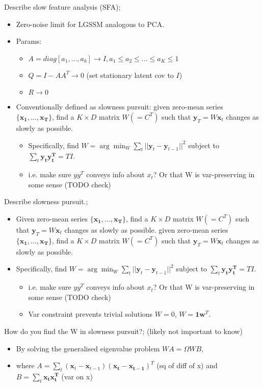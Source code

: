 \documentclass{article}
\begin{document}
Describe slow feature analysis (SFA); \begin{itemize} \item Zero-noise limit for LGSSM analogous to PCA. \item Params: \begin{itemize} \item $A=diag[a_1,...,a_k]\rightarrow I, a_1\leq a_2 \leq ...\leq a_K\leq 1$ \item $Q=I-AA^T\rightarrow 0$ (set stationary latent cov to $I$) \item $R\rightarrow 0$ \end{itemize} \item Conventionally defined as slowness pursuit: given zero-mean series $\{\mathbf{x_1,...,x_T}\}$, find a $K\times D$ matrix $W(=C^T)$ such that $\mathbf{y}_T=W\mathbf{x}_t$ changes as slowly as possible. \begin{itemize} \item Specifically, find $W=\arg\min_W\sum_t||\mathbf{y}_t-\mathbf{y}_{t-1}||^2$ subject to $\sum_t\mathbf{y_ty_t^T}=TI$. \item i.e. make sure $yy^T$ conveys info about $x_t$? Or that W is var-preserving in some sense (TODO check) \end{itemize} \end{itemize}

Describe slowness pursuit.; \begin{itemize} \item Given zero-mean series $\{\mathbf{x_1,...,x_T}\}$, find a $K\times D$ matrix $W(=C^T)$ such that $\mathbf{y}_T=W\mathbf{x}_t$ changes as slowly as possible. given zero-mean series $\{\mathbf{x_1,...,x_T}\}$, find a $K\times D$ matrix $W(=C^T)$ such that $\mathbf{y}_T=W\mathbf{x}_t$ changes as slowly as possible. \item Specifically, find $W=\arg\min_W\sum_t||\mathbf{y}_t-\mathbf{y}_{t-1}||^2$ subject to $\sum_t\mathbf{y_ty_t^T}=TI$. \begin{itemize} \item i.e. make sure $yy^T$ conveys info about $x_t$? Or that W is var-preserving in some sense (TODO check) \item Var constraint prevents trivial solutions $W=0$, $W=\mathbf{1w}^T$. \end{itemize} \end{itemize}

How do you find the W in slowness pursuit?; (likely not important to know) \begin{itemize} \item By solving the generalised eigenvalue problem $WA=\Omega WB$,  \item where $A=\sum_t (\mathbf{x}_t - \mathbf{x}_{t-1})(\mathbf{x_t - x_{t-1}})^T$ (sq of diff of x) and $B=\sum_t\mathbf{x_tx_t^T}$ (var on x) \end{itemize} 
\end{document}
